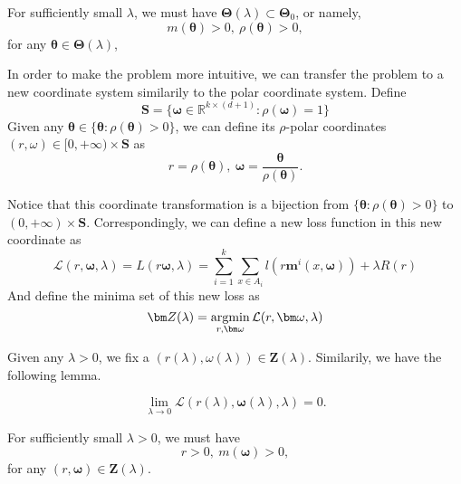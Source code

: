 \begin{corollary}
	For sufficiently small $\lambda$, we must have $\bm\Theta(\lambda) \subset \bm\Theta_0 $, or namely, 
	\[
	m(\bm\theta) > 0,\ \rho(\bm\theta) >0,
	\]
	for any $\bm\theta \in \bm\Theta(\lambda)$, 
\end{corollary}


In order to make the problem more intuitive, we can transfer the problem to a new coordinate system similarily to the polar coordinate system. Define
\begin{equation}
\bm S = \{\bm\omega\in \mathbb{R}^{k\times (d+1)}: \rho(\bm \omega) = 1\}
\end{equation}
Given any $\bm\theta\in \{\bm\theta: \rho(\bm\theta) > 0\}$, we can define its $\rho$-polar coordinates $(r,\omega) \in [0,+\infty) \times \bm S$ as 
\begin{equation}
r = \rho(\bm\theta),\ \bm\omega = \frac{\bm\theta}{\rho(\bm\theta)}.
\end{equation}

Notice that this coordinate transformation is a bijection from $\{\bm\theta: \rho(\bm\theta) > 0\}$ to  $(0,+\infty)\times \bm S$.
Correspondingly, we can define a new loss function in this new coordinate as
\begin{equation}
 \mathcal L(r,\bm\omega,\lambda) = L(r\bm\omega, \lambda) = \sum_{i =  1}^{k} \sum_{x\in A_i} l(r\bm m^i(x,\bm\omega)) + \lambda R(r)
\end{equation}
And define the minima set of this new loss as 
\begin{equation}
\bm Z(\lambda) = \mathop{\rm argmin}_{r, \bm\omega} \mathcal L(r,\bm\omega,\lambda) 
\end{equation}

Given any $\lambda>0$, we fix a $ (r(\lambda),\omega(\lambda))\in \bm Z(\lambda)$. Similarily, we have the following lemma.
\begin{lemma}
	\begin{equation}
	\lim\limits_{\lambda\rightarrow 0} \mathcal L(r(\lambda),\bm\omega(\lambda),\lambda) = 0. 
	\end{equation}
\end{lemma}



\begin{corollary}\label{Maxmargin3}
	For sufficiently small $\lambda >0$, we must have
	\[
	r> 0,\ m(\bm\omega) > 0,
	\]
	for any $(r,\bm\omega) \in \bm Z(\lambda)$.
\end{corollary}

